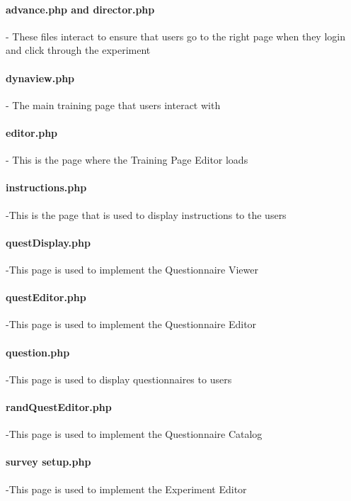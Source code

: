 \documentclass[article]{ij4uq}              %
\begin{document}
\paragraph{advance.php and director.php} - These files interact to ensure that users go to the right page when they login and click through the experiment

\paragraph{dynaview.php} - The main training page that users interact with

\paragraph{editor.php} - This is the page where the Training Page Editor loads

\paragraph{instructions.php} -This is the page that is used to display instructions to the users 

\paragraph{questDisplay.php} -This page is used to implement the Questionnaire Viewer

\paragraph{questEditor.php} -This page is used to implement the Questionnaire Editor 

\paragraph{question.php} -This page is used to display questionnaires to users 

\paragraph{randQuestEditor.php} -This page is used to implement the Questionnaire Catalog 

\paragraph{survey setup.php} -This page is used to implement the Experiment Editor
\end{document}
